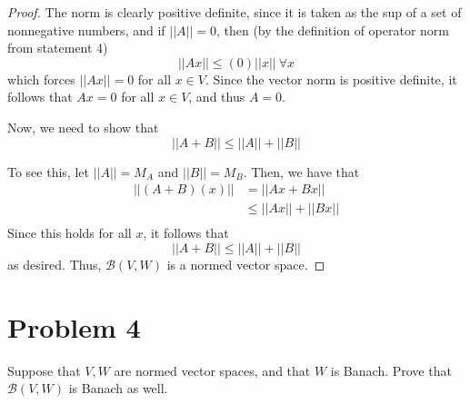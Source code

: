 \documentclass[fontsize=11pt]{scrartcl} %
\numberwithin{equation}{section} %
\numberwithin{figure}{section} %
\numberwithin{table}{section} %
\begin{document}
\begin{proof}
    The norm is clearly positive definite, since it is taken as the sup of a set
    of nonnegative numbers, and if $||A||=0$, then (by the
    definition of operator norm from statement 4)
    \[
        ||Ax||\leq (0)||x||\ \forall x
    \]
    which forces $||Ax||=0$ for all $x\in V$. Since the vector norm is positive
    definite, it follows that $Ax=0$ for all $x\in V$, and thus $A=0$.

    Now, we need to show that
    \[
        ||A+B|| \leq ||A||+||B||
    \]

    To see this, let $||A||=M_A$ and $||B||=M_B$. Then, we have that
    \[
        \begin{aligned}
            ||(A+B)(x)|| &= ||Ax+Bx||\\
                        &\leq ||Ax||+||Bx||\\
        \end{aligned}
    \]
    Since this holds for all $x$, it follows that
    \[
        ||A+B||\leq ||A||+||B||
    \]
    as desired. Thus, $\mathscr{B}(V,W)$ is a normed vector space.
\end{proof}

\newpage
\section*{Problem 4}
Suppose that $V,W$ are normed vector spaces, and that $W$ is Banach. Prove that
$\mathscr{B}(V,W)$ is Banach as well.


\end{document}
